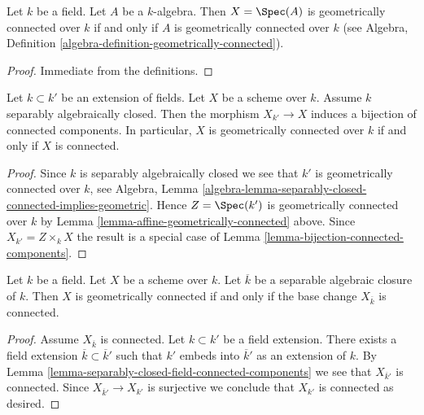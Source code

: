 \begin{lemma}
\label{lemma-affine-geometrically-connected}
Let $k$ be a field.
Let $A$ be a $k$-algebra.
Then $X = \Spec(A)$ is geometrically connected over $k$
if and only if $A$ is geometrically connected over $k$ (see
Algebra, Definition \ref{algebra-definition-geometrically-connected}).
\end{lemma}

\begin{proof}
Immediate from the definitions.
\end{proof}

\begin{lemma}
\label{lemma-separably-closed-field-connected-components}
Let $k \subset k'$ be an extension of fields.
Let $X$ be a scheme over $k$.
Assume $k$ separably algebraically closed.
Then the morphism $X_{k'} \to X$ induces a bijection of connected
components. In particular, $X$ is geometrically connected over $k$
if and only if $X$ is connected.
\end{lemma}

\begin{proof}
Since $k$ is separably algebraically closed we see that
$k'$ is geometrically connected over $k$, see
Algebra,
Lemma \ref{algebra-lemma-separably-closed-connected-implies-geometric}.
Hence $Z = \Spec(k')$ is geometrically connected over $k$ by
Lemma \ref{lemma-affine-geometrically-connected}
above. Since $X_{k'} = Z \times_k X$ the result is a special case of
Lemma \ref{lemma-bijection-connected-components}.
\end{proof}

\begin{lemma}
\label{lemma-characterize-geometrically-connected}
Let $k$ be a field.
Let $X$ be a scheme over $k$.
Let $\overline{k}$ be a separable algebraic closure of $k$.
Then $X$ is geometrically connected if and only if the base change
$X_{\overline{k}}$ is connected.
\end{lemma}

\begin{proof}
Assume $X_{\overline{k}}$ is connected.
Let $k \subset k'$ be a field extension.
There exists a field extension $\overline{k} \subset \overline{k}'$
such that $k'$ embeds into $\overline{k}'$ as an extension of $k$.
By Lemma \ref{lemma-separably-closed-field-connected-components}
we see that $X_{\overline{k}'}$ is connected.
Since $X_{\overline{k}'} \to X_{k'}$ is surjective we conclude
that $X_{k'}$ is connected as desired.
\end{proof}

